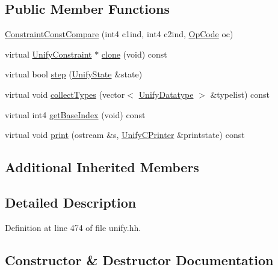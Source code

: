 \subsection*{Public Member Functions}
\begin{DoxyCompactItemize}
\item 
\mbox{\hyperlink{class_constraint_const_compare_a74ba04e9ef1c6b960fc3a7eb63cc8e6d}{Constraint\+Const\+Compare}} (int4 c1ind, int4 c2ind, \mbox{\hyperlink{opcodes_8hh_abeb7dfb0e9e2b3114e240a405d046ea7}{Op\+Code}} oc)
\item 
virtual \mbox{\hyperlink{class_unify_constraint}{Unify\+Constraint}} $\ast$ \mbox{\hyperlink{class_constraint_const_compare_a6129d61238d6361ca597764c82e17f5a}{clone}} (void) const
\item 
virtual bool \mbox{\hyperlink{class_constraint_const_compare_abbb5ae34af8b206328c9dd9147fd6824}{step}} (\mbox{\hyperlink{class_unify_state}{Unify\+State}} \&state)
\item 
virtual void \mbox{\hyperlink{class_constraint_const_compare_a081a87a9985fd65cad3fa41675e9c929}{collect\+Types}} (vector$<$ \mbox{\hyperlink{class_unify_datatype}{Unify\+Datatype}} $>$ \&typelist) const
\item 
virtual int4 \mbox{\hyperlink{class_constraint_const_compare_a7a01c7972c3b10b811f22a8f6595f4b2}{get\+Base\+Index}} (void) const
\item 
virtual void \mbox{\hyperlink{class_constraint_const_compare_a7b46d6503d830e7abea5bbed14cde0d5}{print}} (ostream \&s, \mbox{\hyperlink{class_unify_c_printer}{Unify\+C\+Printer}} \&printstate) const
\end{DoxyCompactItemize}
\subsection*{Additional Inherited Members}


\subsection{Detailed Description}


Definition at line 474 of file unify.\+hh.



\subsection{Constructor \& Destructor Documentation}
\mbox{\label{class_constraint_const_compare_a74ba04e9ef1c6b960fc3a7eb63cc8e6d}} 
